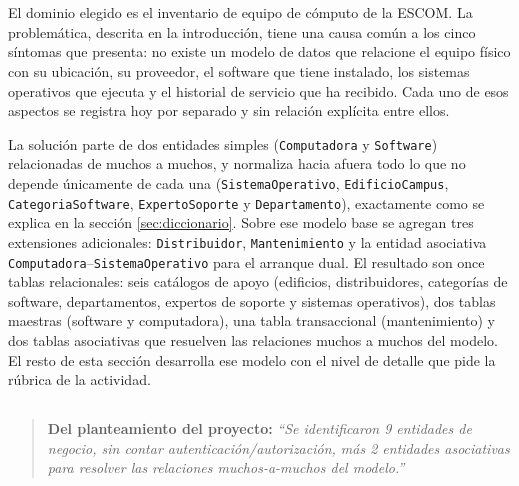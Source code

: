 \documentclass[10pt,a4paper]{article}
\begin{document}
\section{\color{colorIPN}{Desarrollo}}

\subsection{ \color{colorESCOM}{Problemática y solución propuesta}}

El dominio elegido es el inventario de equipo de cómputo de la ESCOM. La problemática, descrita en la introducción, tiene una causa común a los cinco síntomas que presenta: no existe un modelo de datos que relacione el equipo físico con su ubicación, su proveedor, el software que tiene instalado, los sistemas operativos que ejecuta y el historial de servicio que ha recibido. Cada uno de esos aspectos se registra hoy por separado y sin relación explícita entre ellos.

La solución parte de dos entidades simples (\texttt{Computadora} y \texttt{Software}) relacionadas de muchos a muchos, y normaliza hacia afuera todo lo que no depende únicamente de cada una (\texttt{SistemaOperativo}, \texttt{EdificioCampus}, \texttt{CategoriaSoftware}, \texttt{ExpertoSoporte} y \texttt{Departamento}), exactamente como se explica en la sección \ref{sec:diccionario}. Sobre ese modelo base se agregan tres extensiones adicionales: \texttt{Distribuidor}, \texttt{Mantenimiento} y la entidad asociativa \texttt{Computadora}--\texttt{SistemaOperativo} para el arranque dual. El resultado son once tablas relacionales: seis catálogos de apoyo (edificios, distribuidores, categorías de software, departamentos, expertos de soporte y sistemas operativos), dos tablas maestras (software y computadora), una tabla transaccional (mantenimiento) y dos tablas asociativas que resuelven las relaciones muchos a muchos del modelo. El resto de esta sección desarrolla ese modelo con el nivel de detalle que pide la rúbrica de la actividad.

\subsection{ \color{colorESCOM}{Entidades identificadas}}

\begin{quote}
	\color{colorIPN}\textbf{Del planteamiento del proyecto:} \textit{\enquote{Se identificaron 9 entidades de negocio, sin contar autenticación/autorización, más 2 entidades asociativas para resolver las relaciones muchos-a-muchos del modelo.}}
\end{quote}
\end{document}

